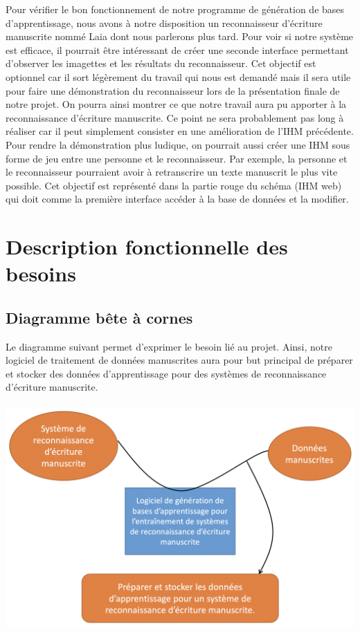 Pour vérifier le bon fonctionnement de notre programme de génération de bases d’apprentissage, nous avons à notre
disposition un reconnaisseur d’écriture manuscrite nommé Laia\cite{laia:2016} dont nous parlerons plus tard.
Pour voir si notre système est efficace, il pourrait être intéressant de créer une seconde interface permettant
d’observer les imagettes et les résultats du reconnaisseur. Cet objectif est optionnel car il sort légèrement du
travail qui nous est demandé mais il sera utile pour faire une démonstration du reconnaisseur lors de la présentation
finale de notre projet. On pourra ainsi montrer ce que notre travail aura pu apporter à la reconnaissance d’écriture
manuscrite. Ce point ne sera probablement pas long à réaliser car il peut simplement consister en une amélioration
de l’IHM précédente. Pour rendre la démonstration plus ludique, on pourrait aussi créer une IHM sous forme de jeu
entre une personne et le reconnaisseur. Par exemple, la personne et le reconnaisseur pourraient avoir à retranscrire
un texte manuscrit le plus vite possible. Cet objectif est représenté dans la partie rouge du schéma (IHM web) qui
doit comme la première interface accéder à la base de données et la modifier.

\section{Description fonctionnelle des besoins}

\subsection{Diagramme bête à cornes}

Le diagramme suivant permet d’exprimer le besoin lié au projet. Ainsi, notre logiciel de
traitement de données manuscrites aura pour but principal de préparer et stocker des données
d’apprentissage pour des systèmes de reconnaissance d’écriture manuscrite.

\newpage

\paragraph{}
\begin{mdframed}[frametitle={Figure 6 : Diagramme bête à cornes}, innerbottommargin=10]
\begin{center}
\includegraphics[width=0.6\linewidth]{bete-a-cornes.png}
\end{center}
\end{mdframed}

